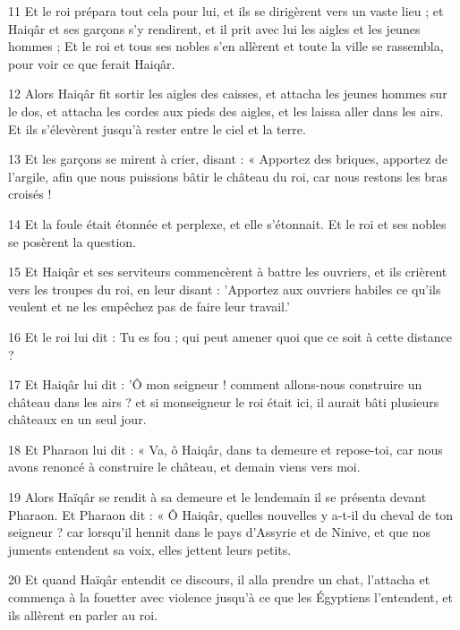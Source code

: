 \par 11 Et le roi prépara tout cela pour lui, et ils se dirigèrent vers un vaste lieu ; et Haiqâr et ses garçons s'y rendirent, et il prit avec lui les aigles et les jeunes hommes ; Et le roi et tous ses nobles s'en allèrent et toute la ville se rassembla, pour voir ce que ferait Haiqâr.

\par 12 Alors Haiqâr fit sortir les aigles des caisses, et attacha les jeunes hommes sur le dos, et attacha les cordes aux pieds des aigles, et les laissa aller dans les airs. Et ils s’élevèrent jusqu’à rester entre le ciel et la terre.

\par 13 Et les garçons se mirent à crier, disant : « Apportez des briques, apportez de l'argile, afin que nous puissions bâtir le château du roi, car nous restons les bras croisés !

\par 14 Et la foule était étonnée et perplexe, et elle s'étonnait. Et le roi et ses nobles se posèrent la question.

\par 15 Et Haiqâr et ses serviteurs commencèrent à battre les ouvriers, et ils crièrent vers les troupes du roi, en leur disant : 'Apportez aux ouvriers habiles ce qu'ils veulent et ne les empêchez pas de faire leur travail.'

\par 16 Et le roi lui dit : Tu es fou ; qui peut amener quoi que ce soit à cette distance ?

\par 17 Et Haiqâr lui dit : 'Ô mon seigneur ! comment allons-nous construire un château dans les airs ? et si monseigneur le roi était ici, il aurait bâti plusieurs châteaux en un seul jour.

\par 18 Et Pharaon lui dit : « Va, ô Haiqâr, dans ta demeure et repose-toi, car nous avons renoncé à construire le château, et demain viens vers moi.

\par 19 Alors Haïqâr se rendit à sa demeure et le lendemain il se présenta devant Pharaon. Et Pharaon dit : « Ô Haiqâr, quelles nouvelles y a-t-il du cheval de ton seigneur ? car lorsqu'il hennit dans le pays d'Assyrie et de Ninive, et que nos juments entendent sa voix, elles jettent leurs petits.

\par 20 Et quand Haïqâr entendit ce discours, il alla prendre un chat, l'attacha et commença à la fouetter avec violence jusqu'à ce que les Égyptiens l'entendent, et ils allèrent en parler au roi.


